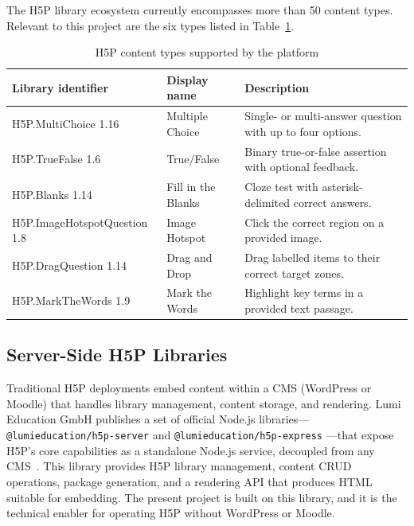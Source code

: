 The H5P library ecosystem currently encompasses more than 50 content types.
Relevant to this project are the six types listed in Table~\ref{tab:h5p_types}.

\begin{table}[H]
  \centering
  \caption{H5P content types supported by the platform}
  \label{tab:h5p_types}
  \begin{tabularx}{\linewidth}{llX}
    \toprule
    \textbf{Library identifier} & \textbf{Display name} & \textbf{Description} \\
    \midrule
    H5P.MultiChoice 1.16         & Multiple Choice    & Single- or multi-answer question with up to four options. \\
    H5P.TrueFalse 1.6            & True/False         & Binary true-or-false assertion with optional feedback. \\
    H5P.Blanks 1.14              & Fill in the Blanks & Cloze test with asterisk-delimited correct answers. \\
    H5P.ImageHotspotQuestion 1.8 & Image Hotspot      & Click the correct region on a provided image. \\
    H5P.DragQuestion 1.14        & Drag and Drop      & Drag labelled items to their correct target zones. \\
    H5P.MarkTheWords 1.9         & Mark the Words     & Highlight key terms in a provided text passage. \\
    \bottomrule
  \end{tabularx}
\end{table}

\subsection{Server-Side H5P Libraries}

Traditional H5P deployments embed content within a CMS (WordPress or Moodle)
that handles library management, content storage, and rendering. Lumi
Education GmbH publishes a set of official Node.js libraries---
\texttt{@lumieducation/h5p-server} and \texttt{@lumieducation/h5p-express}
---that expose H5P's core capabilities as a standalone Node.js service,
decoupled from any CMS~\cite{lumieducation2023}. This library provides
H5P library management, content CRUD operations, package generation, and a
rendering API that produces HTML suitable for embedding. The present project
is built on this library, and it is the technical enabler for operating
H5P without WordPress or Moodle.

